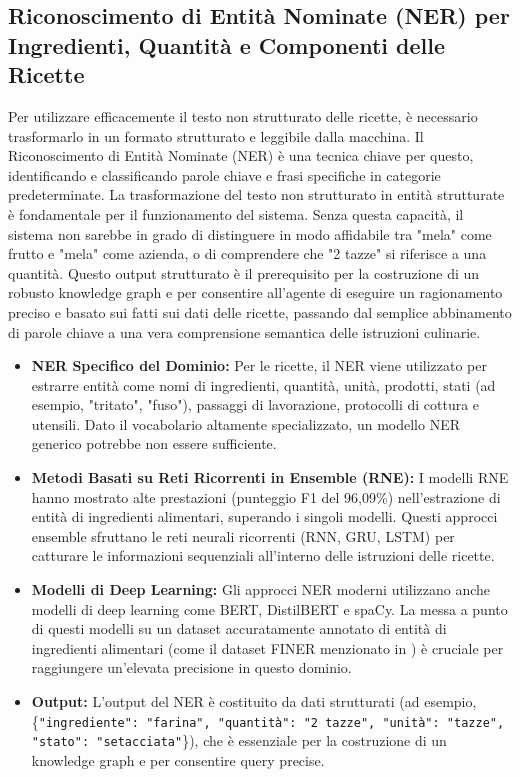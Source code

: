 \documentclass[a4paper, 11pt]{article}
\begin{document}
\subsection{Riconoscimento di Entità Nominate (NER) per Ingredienti, Quantità e Componenti delle Ricette}
Per utilizzare efficacemente il testo non strutturato delle ricette, è necessario trasformarlo in un formato strutturato e leggibile dalla macchina. Il Riconoscimento di Entità Nominate (NER) è una tecnica chiave per questo, identificando e classificando parole chiave e frasi specifiche in categorie predeterminate. \cite{deep_learning_ner_recipes} La trasformazione del testo non strutturato in entità strutturate è fondamentale per il funzionamento del sistema. Senza questa capacità, il sistema non sarebbe in grado di distinguere in modo affidabile tra "mela" come frutto e "mela" come azienda, o di comprendere che "2 tazze" si riferisce a una quantità. Questo output strutturato è il prerequisito per la costruzione di un robusto knowledge graph e per consentire all'agente di eseguire un ragionamento preciso e basato sui fatti sui dati delle ricette, passando dal semplice abbinamento di parole chiave a una vera comprensione semantica delle istruzioni culinarie.
\begin{itemize}
    \item \textbf{NER Specifico del Dominio:} Per le ricette, il NER viene utilizzato per estrarre entità come nomi di ingredienti, quantità, unità, prodotti, stati (ad esempio, "tritato", "fuso"), passaggi di lavorazione, protocolli di cottura e utensili. \cite{deep_learning_ner_recipes} Dato il vocabolario altamente specializzato, un modello NER generico potrebbe non essere sufficiente.
    \item \textbf{Metodi Basati su Reti Ricorrenti in Ensemble (RNE):} I modelli RNE hanno mostrato alte prestazioni (punteggio F1 del 96,09\%) nell'estrazione di entità di ingredienti alimentari, superando i singoli modelli. \cite{enhancing_food_ner_rne} Questi approcci ensemble sfruttano le reti neurali ricorrenti (RNN, GRU, LSTM) per catturare le informazioni sequenziali all'interno delle istruzioni delle ricette.
    \item \textbf{Modelli di Deep Learning:} Gli approcci NER moderni utilizzano anche modelli di deep learning come BERT, DistilBERT e spaCy. \cite{deep_learning_ner_recipes} La messa a punto di questi modelli su un dataset accuratamente annotato di entità di ingredienti alimentari (come il dataset FINER menzionato in \cite{enhancing_food_ner_rne}) è cruciale per raggiungere un'elevata precisione in questo dominio.
    \item \textbf{Output:} L'output del NER è costituito da dati strutturati (ad esempio, \{\texttt{"ingrediente": "farina", "quantità": "2 tazze", "unità": "tazze", "stato": "setacciata"}\}), che è essenziale per la costruzione di un knowledge graph e per consentire query precise.
\end{itemize}
\end{document}
